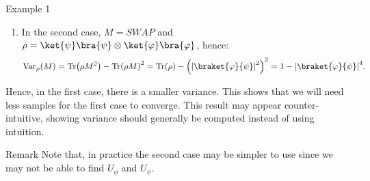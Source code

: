 \documentclass[a4paper]{article}
\begin{document}
\begin{parag}{Example 1}
\begin{enumerate}[left=0pt]
        \item In the second case, $M = SWAP$ and $\rho = \ket{\psi}\bra{\psi} \otimes \ket{\phi}\bra{\phi}$, hence: 
        \[\Var_{\rho}\left(M\right) = \Tr\left(\rho M^2\right) - \Tr\left(\rho M\right)^2 = \Tr\left(\rho\right) - \left(\left|\braket{\phi}{\psi}\right|^2\right)^2 = 1 - \left|\braket{\phi}{\psi}\right|^4.\]
    \end{enumerate}
    
    Hence, in the first case, there is a smaller variance. This shows that we will need less samples for the first case to converge. This result may appear counter-intuitive, showing variance should generally be computed instead of using intuition.

    \begin{subparag}{Remark}
        Note that, in practice the second case may be simpler to use since we may not be able to find $U_{\phi}$ and $U_{\psi}$.
    \end{subparag}
\end{parag}
\end{document}
